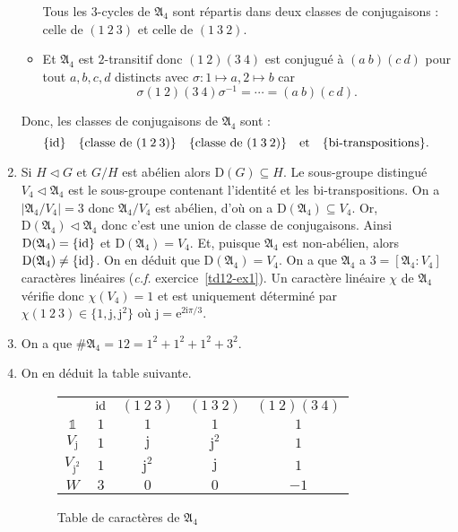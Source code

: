 \documentclass[./main]{subfiles}
\begin{document}
\begin{enumerate}
\begin{itemize}
           Tous les $3$-cycles de $\mathfrak{A}_4$ sont répartis dans deux classes de conjugaisons : celle de  $(1\:2\:3)$ et celle de  $(1\:3\:2)$.

         \item Et $\mathfrak{A}_4$ est  $2$-transitif donc $(1\:2)(3\:4)$ est conjugué à  $(a\:b)(c\:d)$ pour tout  $a,b,c,d$ distincts
           avec  $\sigma : 1 \mapsto a, 2 \mapsto b$ car  \[
           \sigma (1\:2)(3\:4) \sigma^{-1} = \cdots = (a\:b)(c\:d)
           .\]
      \end{itemize}
      Donc, les classes de conjugaisons de $\mathfrak{A}_4$ sont :
      \[
      \{\operatorname{id}\} \quad \{\text{classe de }(1\:2\:3)\}  \quad \{\text{classe de }(1\:3\:2)\} \quad \text{et} \quad \{\text{bi-transpositions}\} 
      .\]
    \item Si $H \triangleleft G$ et $G / H$ est abélien alors $\mathrm{D}(G) \subseteq H$.
      Le sous-groupe distingué $V_4 \triangleleft \mathfrak{A}_4$ est le sous-groupe contenant l'identité et les bi-transpositions.
      On a $|\mathfrak{A}_4 / V_4| = 3$ donc $\mathfrak{A}_4 / V_4$ est abélien, d'où on a $ \mathrm{D}(\mathfrak{A}_4) \subseteq V_4$.
      Or, $\mathrm{D}(\mathfrak{A}_4) \triangleleft \mathfrak{A}_4$ donc c'est une union de classe de conjugaisons.
      Ainsi $\mathrm{D}(\mathfrak{A}_4) = \{\operatorname{id}\}$ et $\mathrm{D}(\mathfrak{A}_4) = V_4$.
      Et, puisque $\mathfrak{A}_4$ est non-abélien, alors  $\mathrm{D}(\mathfrak{A}_4) \neq \{\operatorname{id}\}$.
      On en déduit que $\mathrm{D}(\mathfrak{A}_4) = V_4$.
      On a que $\mathfrak{A}_4$ a  $3 = [\mathfrak{A}_4 : V_4]$ caractères linéaires (\textit{c.f.} exercice~\ref{td12-ex1}).
      Un caractère linéaire $\chi$ de $\mathfrak{A}_4$ vérifie donc  $\chi(V_4) = 1$ et est uniquement déterminé par  $\chi(1\:2\:3) \in \{1,\mathrm{j}, \mathrm{j}^2\}$ où $\mathrm{j} = \mathrm{e}^{2 \mathrm{i} \pi / 3}$.
    \item On a que $\# \mathfrak{A}_4 = 12 = 1^2 + 1^2 + 1^2 + 3^2$.
    \item On en déduit la table suivante.
      \begin{figure}[H]
        \centering
        \begin{tabular}{c|c|c|c|c}
          $\,$&$\operatorname{id}$&$(1\:2\:3)$&$(1\:3\:2)$&$(1\:2)(3\:4)$\\
          $\mathds{1}$&$1$&$1$&$1$&$1$\\
          $V_{\mathrm{j}}$ & $1$ & $\mathrm{j}$ & $\mathrm{j}^2$ & $1$\\
          $V_{\mathrm{j}^2}$ & $1$ & $\mathrm{j}^2$ & $\mathrm{j}$ & $1$\\
          $W$ & $3$ & $0$ & $0$ & $-1$
        \end{tabular}
        \caption{Table de caractères de $\mathfrak{A}_4$}
      \end{figure}
  \end{enumerate}
\end{document}
